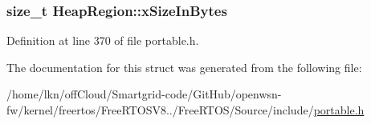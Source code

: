 \subsubsection[{\texorpdfstring{x\+Size\+In\+Bytes}{xSizeInBytes}}]{\setlength{\rightskip}{0pt plus 5cm}size\+\_\+t Heap\+Region\+::x\+Size\+In\+Bytes}\hypertarget{struct_heap_region_a5933b0fd422e70a92ceef839b89a757f}{}\label{struct_heap_region_a5933b0fd422e70a92ceef839b89a757f}


Definition at line 370 of file portable.\+h.



The documentation for this struct was generated from the following file\+:\begin{DoxyCompactItemize}
\item 
/home/lkn/off\+Cloud/\+Smartgrid-\/code/\+Git\+Hub/openwsn-\/fw/kernel/freertos/\+Free\+R\+T\+O\+S\+V8../\+Free\+R\+T\+O\+S/\+Source/include/\hyperlink{portable_8h}{portable.\+h}\end{DoxyCompactItemize}
